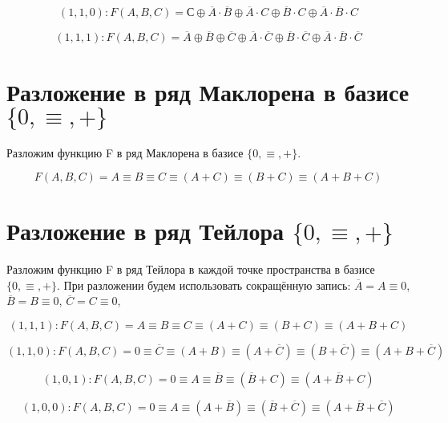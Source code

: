 \documentclass[a4paper,10pt]{article} %
\begin{document}
	\begin{equation}
	(1, 1, 0): F(A, B, C) = С \oplus \overline{A} \cdot \overline{B}
	 \oplus \overline{A} \cdot C \oplus \overline{B} \cdot C 
	 \oplus \overline{A} \cdot \overline{B} \cdot C
	\end{equation}
	
	\begin{equation}
	(1, 1, 1): F(A, B, C) = \overline{A} \oplus \overline{B} \oplus \overline{C} 
	\oplus \overline{A} \cdot \overline{C} \oplus \overline{B} \cdot \overline{C} \oplus \overline{A} \cdot \overline{B} \cdot \overline{C} 
	\end{equation}
	
	\section{Разложение в ряд Маклорена в базисе $\{0, \equiv, +\}$}
	Разложим функцию F в ряд Маклорена в базисе $\{0, \equiv, +\}$.
	
	\begin{equation}
	F(A, B, C) = A \equiv B \equiv C \equiv (A + C) 
	\equiv (B + C) \equiv (A + B + C)
	\end{equation}
	
	
	\section{Разложение в ряд Тейлора $\{0, \equiv, +\}$}
	Разложим функцию F в ряд Тейлора в каждой точке пространства в базисе 
	$\{0, \equiv, +\}$. При разложении будем использовать сокращённую запись: 
	$\overline{A} = A \equiv 0$, $\overline{B} = B \equiv 0$,
	$\overline{C} = C \equiv 0$,
	
	\begin{equation}
	(1, 1, 1): F(A, B, C) = A \equiv B \equiv C \equiv (A + C) 
	\equiv (B + C) \equiv (A + B + C)
	\end{equation}
	
	\begin{equation}
	(1, 1, 0): F(A, B, C) = 0 \equiv \overline{C} \equiv (A + B) 
	\equiv (A + \overline{C}) \equiv (B + \overline{C}) 
	\equiv (A + B + \overline{C})
	\end{equation}
	
	\begin{equation}
	(1, 0, 1): F(A, B, C) = 0 \equiv A \equiv \overline{B} 
	\equiv (\overline{B} + C) \equiv (A + \overline{B} + C)
	\end{equation}
	
	\begin{equation}
	(1, 0, 0): F(A, B, C) = 0 \equiv A \equiv (A + \overline{B}) 
	\equiv (\overline{B} + \overline{C}) 
	\equiv (A + \overline{B} + \overline{C})
	\end{equation}
	
\end{document}
